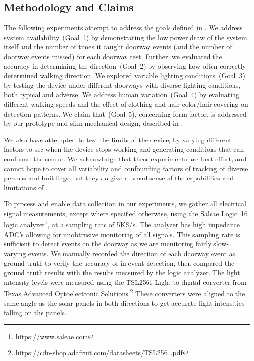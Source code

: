 \subsection{Methodology and Claims}
The following experiments attempt to address the goals defined in .
We address system availability~(Goal~1) by demonstrating the low power draw of the system itself and the number of times it caught doorway events (and the number of doorway events missed) for each doorway test.
Further, we evaluated the accuracy in determining the direction~(Goal~2) by observing how often \sysname correctly determined walking direction.
We explored variable lighting conditions~(Goal~3) by testing the device under \numDoors different doorways with diverse lighting conditions, both typical and adverse.
We address human variation~(Goal~4) by evaluating different walking speeds and the effect of clothing and hair color/hair covering on detection patterns.
We claim that~(Goal~5), concerning form factor, is addressed by our prototype and slim mechanical design, described in .

We also have attempted to test the limits of the device, by varying different factors to see when the device stops working and generating conditions that can confound the sensor.
We acknowledge that these experiments are best effort, and cannot hope to cover all variability and confounding factors of tracking of diverse persons and buildings, but they do give a broad sense of the capabilities and limitations of \sysname.

To process and enable data collection in our experiments, we gather all electrical signal measurements, except where specified otherwise, using the Saleae Logic~16 logic analyzer\footnote{https://www.saleae.com}, at a sampling rate of 5KS/s.
The analyzer has high impedance ADC's allowing for unobtrusive monitoring of all signals.
This sampling rate is sufficient to detect events on the doorway as we are monitoring fairly slow-varying events.
We manually recorded the direction of each doorway event as ground truth to verify the accuracy of \sysname in event detection, then compared the ground truth results with the results measured by the logic analyzer.
The light intensity levels were measured using the TSL2561 Light-to-digital converter from Texas Advanced Optoelectronic Solutions.\footnote{https://cdn-shop.adafruit.com/datasheets/TSL2561.pdf}
These converters were aligned to the same angle as the solar panels in both directions to get accurate light intensities falling on the panels.

